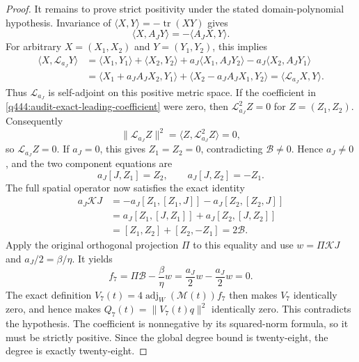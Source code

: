 \begin{proof}
It remains to prove strict positivity under the stated domain-polynomial
hypothesis. Invariance of $\langle X,Y\rangle=-\operatorname{tr}(XY)$
gives
\[
 \langle X,A_JY\rangle=-\langle A_JX,Y\rangle.
\]
For arbitrary $X=(X_1,X_2)$ and $Y=(Y_1,Y_2)$, this implies
\begin{align*}
 \langle X,\mathcal L_{a_J}Y\rangle
 &=\langle X_1,Y_1\rangle+\langle X_2,Y_2\rangle
   +a_J\langle X_1,A_JY_2\rangle
   -a_J\langle X_2,A_JY_1\rangle\\
 &=\langle X_1+a_J A_JX_2,Y_1\rangle
   +\langle X_2-a_J A_JX_1,Y_2\rangle
 =\langle\mathcal L_{a_J}X,Y\rangle.
\end{align*}
Thus $\mathcal L_{a_J}$ is self-adjoint on this positive metric space.
If the coefficient in \eqref{q444:audit-exact-leading-coefficient}
were zero, then $\mathcal L_{a_J}^2Z=0$ for $Z=(Z_1,Z_2)$.
Consequently
\[
 \|\mathcal L_{a_J}Z\|^2
 =\langle Z,\mathcal L_{a_J}^2Z\rangle=0,
\]
so $\mathcal L_{a_J}Z=0$. If $a_J=0$, this gives $Z_1=Z_2=0$,
contradicting $\mathscr B\ne0$. Hence $a_J\ne0$, and the two component
equations are
\[
 a_J[J,Z_1]=Z_2,\qquad a_J[J,Z_2]=-Z_1.
\]
The full spatial operator now satisfies the exact identity
\begin{align*}
 a_J\mathcal KJ
 &=-a_J[Z_1,[Z_1,J]]-a_J[Z_2,[Z_2,J]]\\
 &=a_J[Z_1,[J,Z_1]]+a_J[Z_2,[J,Z_2]]\\
 &=[Z_1,Z_2]+[Z_2,-Z_1]=2\mathscr B.
\end{align*}
Apply the original orthogonal projection $\Pi$ to this equality and
use $w=\Pi\mathcal KJ$ and $a_J/2=\beta/\eta$. It yields
\[
 f_7=\Pi\mathscr B-\frac{\beta}{\eta}w
    =\frac{a_J}2w-\frac{a_J}2w=0.
\]
The exact definition $V_7(t)=4\operatorname{adj}_W(\mathscr M(t))f_7$
then makes $V_7$ identically zero, and hence makes
$Q_7(t)=\|V_7(t)q\|^2$ identically zero. This contradicts the
hypothesis. The coefficient is nonnegative by its squared-norm formula,
so it must be strictly positive. Since the global degree bound is
twenty-eight, the degree is exactly twenty-eight.
\end{proof}
